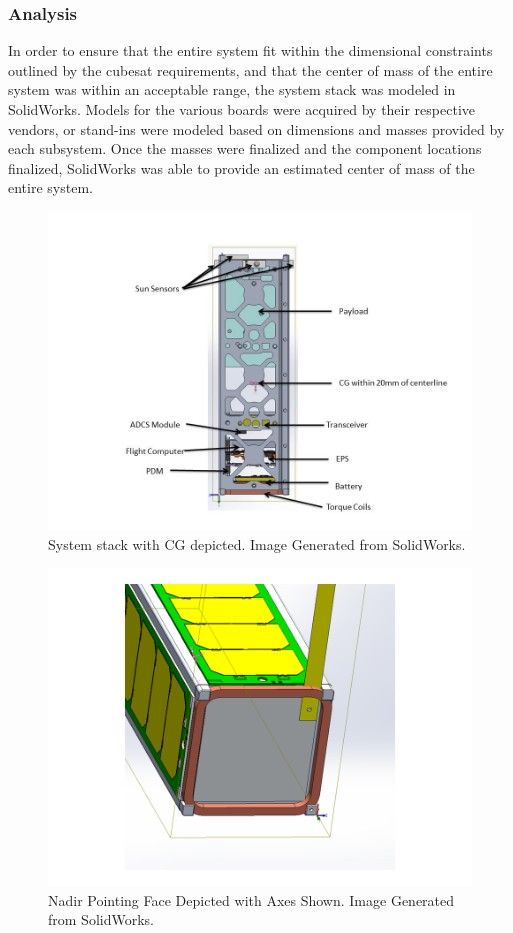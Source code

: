 \documentclass[12pt]{article}
\begin{document}
\subsubsection{Analysis}

In order to ensure that the entire system fit within the dimensional constraints outlined by the cubesat requirements, and that the center of mass of the entire system was within an acceptable range, the system stack was modeled in SolidWorks. Models for the various boards were acquired by their respective vendors, or stand-ins were modeled based on dimensions and masses provided by each subsystem. Once the masses were finalized and the component locations finalized, SolidWorks was able to provide an estimated center of mass of the entire system.

\begin{figure}[!ht]
\centering
\includegraphics[width=5in]{images/STR-6-revised.jpg}
\caption{System stack with CG depicted. Image Generated from SolidWorks.}
\label{fig:str-6}
\end{figure}


\begin{figure}[!ht]
\centering
\includegraphics[width=5in]{images/STR-7(2).png}
\caption{Nadir Pointing Face Depicted with Axes Shown. Image Generated from SolidWorks.}
\label{fig:str-7}
\end{figure}
\end{document}
